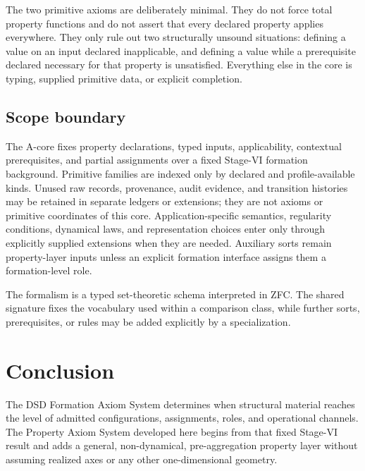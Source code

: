 \documentclass[11pt]{article}
\theoremstyle{definition}
\theoremstyle{remark}
\begin{document}
The two primitive axioms are deliberately minimal.
They do not force total property functions and do not assert that every declared property applies everywhere.
They only rule out two structurally unsound situations: defining a value on an input declared inapplicable, and defining a value while a prerequisite declared necessary for that property is unsatisfied.
Everything else in the core is typing, supplied primitive data, or explicit completion.

\subsection{Scope boundary}

The A-core fixes property declarations, typed inputs, applicability, contextual prerequisites, and partial assignments over a fixed Stage-VI formation background. Primitive families are indexed only by declared and profile-available kinds. Unused raw records, provenance, audit evidence, and transition histories may be retained in separate ledgers or extensions; they are not axioms or primitive coordinates of this core.
Application-specific semantics, regularity conditions, dynamical laws, and representation choices enter only through explicitly supplied extensions when they are needed.
Auxiliary sorts remain property-layer inputs unless an explicit formation interface assigns them a formation-level role.

The formalism is a typed set-theoretic schema interpreted in ZFC.
The shared signature fixes the vocabulary used within a comparison class, while further sorts, prerequisites, or rules may be added explicitly by a specialization.

\section{Conclusion}
\label{sec:conclusion}

The DSD Formation Axiom System determines when structural material reaches the level of admitted configurations, assignments, roles, and operational channels.
The Property Axiom System developed here begins from that fixed Stage-VI result and adds a general, non-dynamical, pre-aggregation property layer without assuming realized axes or any other one-dimensional geometry.
\end{document}
